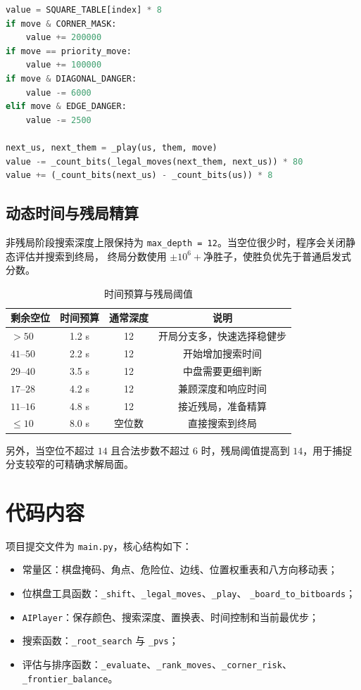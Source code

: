 \begin{lstlisting}[language=Python,caption={动作排序的主要评分项}]
value = SQUARE_TABLE[index] * 8
if move & CORNER_MASK:
    value += 200000
if move == priority_move:
    value += 100000
if move & DIAGONAL_DANGER:
    value -= 6000
elif move & EDGE_DANGER:
    value -= 2500

next_us, next_them = _play(us, them, move)
value -= _count_bits(_legal_moves(next_them, next_us)) * 80
value += (_count_bits(next_us) - _count_bits(us)) * 8
\end{lstlisting}

\subsection{动态时间与残局精算}

非残局阶段搜索深度上限保持为 \texttt{max\_depth = 12}。当空位很少时，程序会关闭静态评估并搜索到终局，
终局分数使用 $\pm 10^6+\text{净胜子}$，使胜负优先于普通启发式分数。

\begin{table}[H]
    \centering
    \caption{时间预算与残局阈值}
    \begin{tabular}{lccc}
        \toprule
        剩余空位 & 时间预算 & 通常深度 & 说明 \\
        \midrule
        $>50$ & 1.2 s & 12 & 开局分支多，快速选择稳健步 \\
        $41$--$50$ & 2.2 s & 12 & 开始增加搜索时间 \\
        $29$--$40$ & 3.5 s & 12 & 中盘需要更细判断 \\
        $17$--$28$ & 4.2 s & 12 & 兼顾深度和响应时间 \\
        $11$--$16$ & 4.8 s & 12 & 接近残局，准备精算 \\
        $\le 10$ & 8.0 s & 空位数 & 直接搜索到终局 \\
        \bottomrule
    \end{tabular}
\end{table}

另外，当空位不超过 $14$ 且合法步数不超过 $6$ 时，残局阈值提高到 $14$，用于捕捉分支较窄的可精确求解局面。

\section{代码内容}

项目提交文件为 \texttt{main.py}，核心结构如下：
\begin{itemize}
    \item 常量区：棋盘掩码、角点、危险位、边线、位置权重表和八方向移动表；
    \item 位棋盘工具函数：\texttt{\_shift}、\texttt{\_legal\_moves}、\texttt{\_play}、
          \texttt{\_board\_to\_bitboards}；
    \item \texttt{AIPlayer}：保存颜色、搜索深度、置换表、时间控制和当前最优步；
    \item 搜索函数：\texttt{\_root\_search} 与 \texttt{\_pvs}；
    \item 评估与排序函数：\texttt{\_evaluate}、\texttt{\_rank\_moves}、\texttt{\_corner\_risk}、
          \texttt{\_frontier\_balance}。
\end{itemize}

